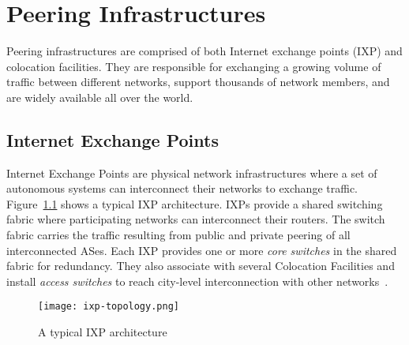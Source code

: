 \chapter{Peering Infrastructures}\label{cap:background}
\thispagestyle{empty}



	Peering infrastructures are comprised of both Internet exchange points (IXP) and colocation facilities. They are responsible for exchanging a growing volume of traffic between different networks, support thousands of network members, and are widely available all over the world.


	\section{Internet Exchange Points}
	\label{subsec:ixp}

	Internet Exchange Points are physical network infrastructures where a set of autonomous systems can interconnect their networks to exchange traffic. Figure~\ref{fig:ixp-topology} shows a typical IXP architecture. IXPs provide a shared switching fabric where participating networks can interconnect their routers. The switch fabric carries the traffic resulting from public and private peering of all interconnected ASes. Each IXP provides one or more \emph{core switches} in the shared fabric for redundancy. They also associate with several Colocation Facilities and install \emph{access switches} to reach city-level interconnection with other networks~\cite{Giotsas:2015:MPI:2716281.2836122}.

	\begin{figure}[t]
	    \centering
	    \texttt{[image: ixp-topology.png]}
	    \caption{A typical IXP architecture~\cite{Ager:2012}}
	    \label{fig:ixp-topology}
	\end{figure}

